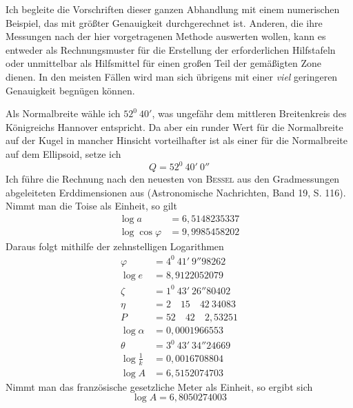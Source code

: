 \indent Ich begleite die Vorschriften dieser ganzen Abhandlung mit einem numerischen Beispiel, das mit größter Genauigkeit durchgerechnet ist. Anderen, die ihre Messungen nach der hier vorgetragenen Methode auswerten wollen, kann es entweder als Rechnungsmuster für die Erstellung der erforderlichen Hilfstafeln oder unmittelbar als Hilfsmittel für einen großen Teil der gemäßigten Zone dienen. In den meisten Fällen wird man sich übrigens mit einer \textit{viel} geringeren Genauigkeit begnügen können.

Als Normalbreite wähle ich \(52^0\ 40'\), was ungefähr dem mittleren Breitenkreis des Königreichs Hannover entspricht. Da aber ein runder Wert für die Normalbreite auf der Kugel in mancher Hinsicht vorteilhafter ist als einer für die Normalbreite auf dem Ellipsoid, setze ich
\[
Q=52^0\ 40'\ 0''
\]
\indent Ich führe die Rechnung nach den neuesten von \textsc{Bessel} aus den Gradmessungen abgeleiteten Erddimensionen aus (Astronomische Nachrichten, Band 19, S. 116). Nimmt man die Toise als Einheit, so gilt
\[
\begin{aligned}
\log a&=6{,}5148235337\\
\log\cos\varphi&=9{,}9985458202
\end{aligned}
\]
Daraus folgt mithilfe der zehnstelligen Logarithmen
\[
\begin{aligned}
\varphi&=4^0\ 41'\ 9''98262\\
\log e&=8{,}9122052079\\
\zeta&=1^0\ 43'\ 26''80402\\
\eta&=2\quad15\quad42\ 34083\\
P&=52\quad42\quad2{,}53251\\
\log\alpha&=0{,}0001966553\\
\theta&=3^0\ 43'\ 34''24669\\
\log\frac{1}{k}&=0{,}0016708804\\
\log A&=6{,}5152074703
\end{aligned}
\]
Nimmt man das französische gesetzliche Meter als Einheit, so ergibt sich
\[
\log A=6{,}8050274003
\]
